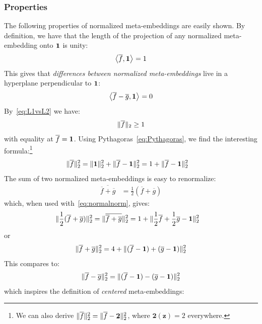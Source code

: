 \documentclass[a4paper,oneside,12pt,english]{report}
\def\zvec{\mathbf{z}}
\def\expv#1#2{\bigl\langle#1\bigr\rangle_{#2}}
\def\dot#1#2{\expv{#1,#2}{}}
\def\normal#1{\overline{#1}}
\begin{document}
\subsubsection{Properties}
The following properties of normalized meta-embeddings are easily shown. By definition, we have that the length of the projection of any normalized meta-embedding onto $\boldsymbol{1}$ is unity:
\begin{align}
\label{eq:LR1}
\dot{\normal{f}}{\onevec} = 1
\end{align}
This gives that \emph{differences between normalized meta-embeddings} live in a hyperplane perpendicular to $\boldsymbol{1}$: 
\begin{align}
\dot{\normal{f}-\normal{g}}{\onevec} = 0
\end{align}
By~\eqref{eq:L1vsL2} we have:
\begin{align}
\norm{\normal{f}} \ge 1
\end{align} 
with equality at $\normal{f}=\onevec$. Using Pythagoras~\eqref{eq:Pythagoras}, we find the interesting formula:\footnote{We can also derive $\norm{\normal{f}}^2=\norm{\normal{f}-\boldsymbol{2}}^2$, where $\boldsymbol{2}(\zvec)=2$ everywhere.}
\begin{align}
\label{eq:normalnorm}
\norm{\normal{f}}^2 &= \norm{\onevec}^2 + \norm{\normal{f}-\onevec}^2 
= 1 + \norm{\normal{f}-\onevec}^2 
\end{align}
The sum of two normalized meta-embeddings is easy to renormalize:
\begin{align}
\normal{\normal{f}+\normal{g}} &= \frac12(\normal{f}+\normal{g})
\end{align}
which, when used with~\eqref{eq:normalnorm}, gives:
\begin{align}
\norm{\frac12(\normal{f}+\normal{g})}^2 &= \norm{\normal{\normal{f}+\normal{g}}}^2
= 1 + \norm{\frac12\normal{f}+\frac12\normal{g}-\onevec}^2
\end{align}
or
\begin{align}
\norm{\normal{f}+\normal{g}}^2 
= 4 + \norm{(\normal{f}-\onevec)+(\normal{g}-\onevec)}^2
\end{align}
This compares to:
\begin{align}
\norm{\normal{f}-\normal{g}}^2 
= \norm{(\normal{f}-\onevec)-(\normal{g}-\onevec)}^2
\end{align}
which inspires the definition of \emph{centered} meta-embeddings:	
	
\end{document}
